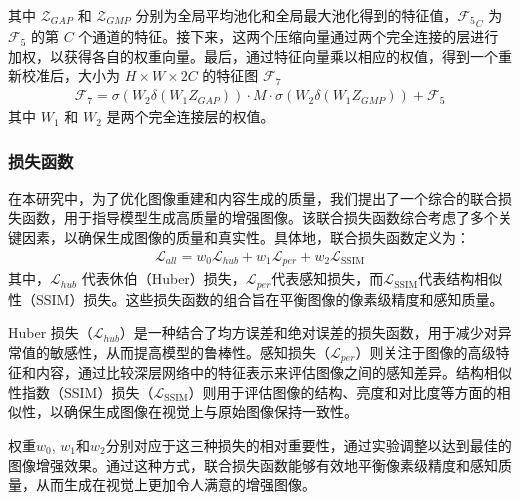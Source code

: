 \documentclass[a4paper]{ctexart}
\begin{document}
	其中 $\mathcal{Z}_{GAP}$ 和 $\mathcal{Z}_{GMP}$ 分别为全局平均池化和全局最大池化得到的特征值，${\mathcal{F}_5}_C$ 为 $\mathcal{F}_5$ 的第 $C$ 个通道的特征。接下来，这两个压缩向量通过两个完全连接的层进行加权，以获得各自的权重向量。最后，通过特征向量乘以相应的权值，得到一个重新校准后，大小为 $H \times W \times 2C$ 的特征图 $\mathcal{F}_7$
	\begin{equation}
		\begin{aligned}
			\mathcal{F}_7 = \sigma \left( W_2 \delta (W_1 Z_{GAP}) \right) \cdot M \cdot \sigma \left( W_2 \delta (W_1 Z_{GMP})\right) +  \mathcal{F}_5
		\end{aligned}
		\label{eq: recalibrated feature map}
	\end{equation}
	其中 $W_1$ 和 $W_2$ 是两个完全连接层的权值。
	
	\subsubsection{损失函数}
	
	在本研究中，为了优化图像重建和内容生成的质量，我们提出了一个综合的联合损失函数，用于指导模型生成高质量的增强图像。该联合损失函数综合考虑了多个关键因素，以确保生成图像的质量和真实性。具体地，联合损失函数定义为：
	\begin{equation}
		\begin{aligned}
			\mathcal{L}_{all} = w_0 \mathcal{L}_{hub} + w_1 \mathcal{L}_{per} + w_2 \mathcal{L}_{\text{SSIM}}
		\end{aligned}
		\label{eq: loss function}
	\end{equation}
	其中，$\mathcal{L}_{hub}$ 代表休伯（Huber）损失\cite{huber1992robust}，$\mathcal{L}_{per}$代表感知损失\cite{johnson2016perceptual}，而$\mathcal{L}_{\text{SSIM}}$代表结构相似性（SSIM）损失\cite{wang2004image}。这些损失函数的组合旨在平衡图像的像素级精度和感知质量。
	
	Huber 损失（$\mathcal{L}_{hub}$）是一种结合了均方误差和绝对误差的损失函数，用于减少对异常值的敏感性，从而提高模型的鲁棒性。感知损失（$\mathcal{L}_{per}$）则关注于图像的高级特征和内容，通过比较深层网络中的特征表示来评估图像之间的感知差异。结构相似性指数（SSIM）损失（$\mathcal{L}_{\text{SSIM}}$）则用于评估图像的结构、亮度和对比度等方面的相似性，以确保生成图像在视觉上与原始图像保持一致性。
	
	权重$w_0$, $w_1$和$w_2$分别对应于这三种损失的相对重要性，通过实验调整以达到最佳的图像增强效果。通过这种方式，联合损失函数能够有效地平衡像素级精度和感知质量，从而生成在视觉上更加令人满意的增强图像。
	
\end{document}

